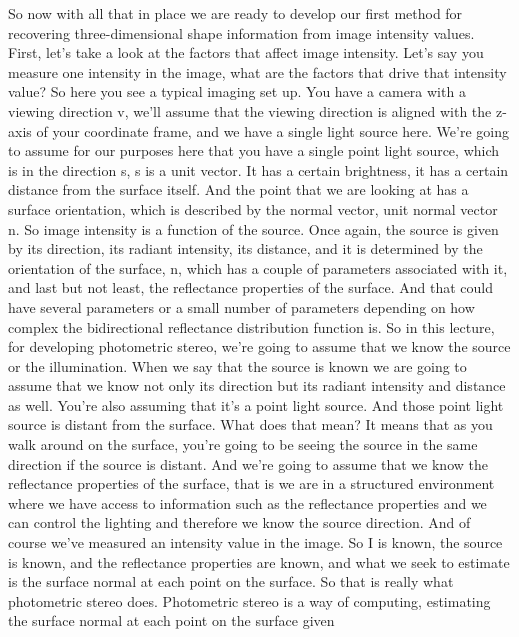 \documentclass[12pt]{article}
\begin{document}
So now with all that in place we are
ready to develop our first method
for recovering three-dimensional shape information from image
intensity values.
First, let's take a look at the factors
that affect image intensity.
Let's say you measure one intensity
in the image, what are the factors that
drive that intensity value?
So here you see a typical imaging set up.
You have a camera with a viewing direction v,
we'll assume that the viewing direction is aligned
with the z-axis of your coordinate frame,
and we have a single light source here.
We're going to assume for our purposes
here that you have a single point light
source, which is in the direction s,
s is a unit vector.
It has a certain brightness, it has a certain distance
from the surface itself.
And the point that we are looking
at has a surface orientation, which
is described by the normal vector, unit normal vector n.
So image intensity is a function of the source.
Once again, the source is given by its direction,
its radiant intensity, its distance,
and it is determined by the orientation of the surface, n,
which has a couple of parameters associated with it,
and last but not least, the reflectance properties
of the surface.
And that could have several parameters or a small number
of parameters depending on how complex
the bidirectional reflectance distribution function is.
So in this lecture, for developing photometric stereo,
we're going to assume that we know
the source or the illumination.
When we say that the source is known
we are going to assume that we know not only
its direction but its radiant intensity and distance as well.
You're also assuming that it's a point light source.
And those point light source is distant from the surface.
What does that mean?
It means that as you walk around on the surface,
you're going to be seeing the source in the same direction
if the source is distant.
And we're going to assume that we
know the reflectance properties of the surface,
that is we are in a structured environment
where we have access to information
such as the reflectance properties
and we can control the lighting and therefore
we know the source direction.
And of course we've measured an intensity value in the image.
So I is known, the source is known,
and the reflectance properties are known,
and what we seek to estimate is the surface
normal at each point on the surface.
So that is really what photometric stereo does.
Photometric stereo is a way of computing, estimating
the surface normal at each point on the surface given
\end{document}
